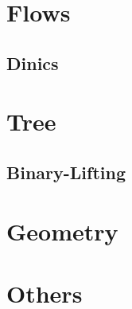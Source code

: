 \section{Flows}
\subsection{Dinics}

\section{Tree}
\subsection{Binary-Lifting}

\section{Geometry}

\section{Others}



